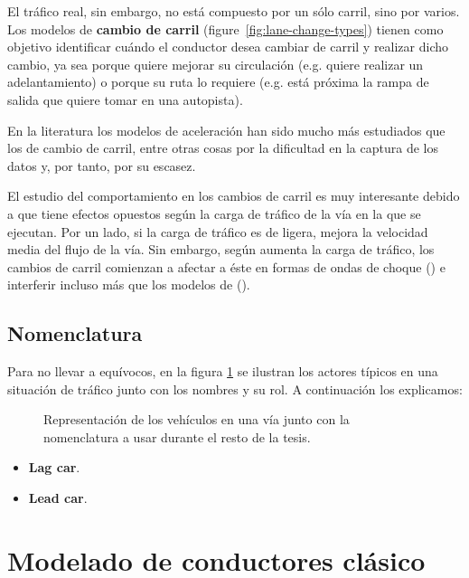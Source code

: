 El tráfico real, sin embargo, no está compuesto por un sólo carril, sino por varios. Los modelos de \textbf{cambio de carril} (figure~\ref{fig:lane-change-types}) tienen como objetivo identificar cuándo el conductor desea cambiar de carril y realizar dicho cambio, ya sea porque quiere mejorar su circulación (e.g. quiere realizar un adelantamiento) o porque su ruta lo requiere (e.g. está próxima la rampa de salida que quiere tomar en una autopista).

En la literatura los modelos de aceleración han sido mucho más estudiados que los de cambio de carril, entre otras cosas por la dificultad en la captura de los datos y, por tanto, por su escasez.

El estudio del comportamiento en los cambios de carril es muy interesante debido a que tiene efectos opuestos según la carga de tráfico de la vía en la que se ejecutan. Por un lado, si la carga de tráfico es de ligera, mejora la velocidad media del flujo de la vía. Sin embargo, según aumenta la carga de tráfico, los cambios de carril comienzan a afectar a éste en formas de ondas de choque (\cite{Sasoh2002, Jin2006}) e interferir incluso más que los modelos de \textit{} (\cite{Laval2006}).

\subsection{Nomenclatura}

Para no llevar a equívocos, en la figura \ref{fig:lane-representation-with-namings} se ilustran los actores típicos en una situación de tráfico junto con los nombres y su rol. A continuación los explicamos:

\begin{figure}[t]
	\caption[Nomenclaturas a usar en los modelos de conducción]{Representación de los vehículos en una vía junto con la nomenclatura a usar durante el resto de la tesis.}
	\label{fig:lane-representation-with-namings}
\end{figure}

\begin{itemize}
	\item \textbf{Lag car}.
	\item \textbf{Lead car}.
\end{itemize}

\section{Modelado de conductores clásico}

